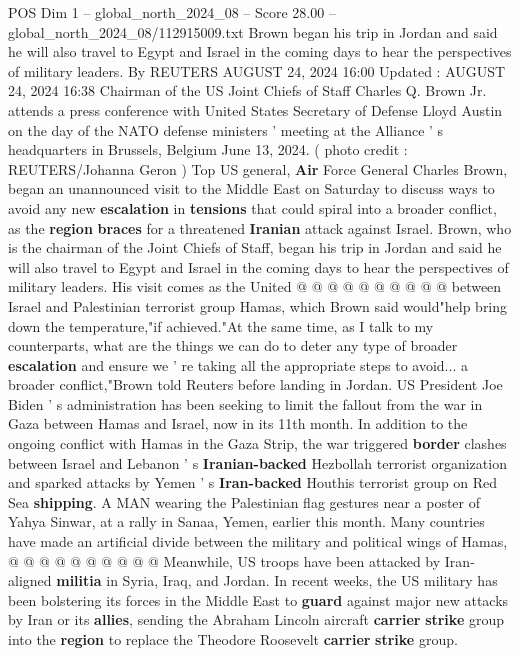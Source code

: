 \begin{textsample}{POS Dim 1 – global\_north\_2024\_08 – Score 28.00 – global\_north\_2024\_08/112915009.txt}  \label{ex:f1_pos_079}
Brown began his trip in Jordan and said he will also travel to Egypt and Israel in the coming days to hear the perspectives of military leaders.
By REUTERS AUGUST 24, 2024 16:00 Updated : AUGUST 24, 2024 16:38 Chairman of the US Joint Chiefs of Staff Charles Q.
Brown Jr. attends a press conference with United States Secretary of Defense Lloyd Austin on the day of the NATO defense ministers ' meeting at the Alliance ' s headquarters in Brussels, Belgium June 13, 2024. ( photo credit : REUTERS/Johanna Geron ) Top US general, \textbf{Air} Force General Charles Brown, began an unannounced visit to the Middle East on Saturday to discuss ways to avoid any new \textbf{escalation} in \textbf{tensions} that could spiral into a broader conflict, as the \textbf{region} \textbf{braces} for a threatened \textbf{Iranian} attack against Israel.
Brown, who is the chairman of the Joint Chiefs of Staff, began his trip in Jordan and said he will also travel to Egypt and Israel in the coming days to hear the perspectives of military leaders.
His visit comes as the United @ @ @ @ @ @ @ @ @ @ between Israel and Palestinian terrorist group Hamas, which Brown said would"help bring down the temperature,"if achieved."At the same time, as I talk to my counterparts, what are the things we can do to deter any type of broader \textbf{escalation} and ensure we ' re taking all the appropriate steps to avoid... a broader conflict,"Brown told Reuters before landing in Jordan.
US President Joe Biden ' s administration has been seeking to limit the fallout from the war in Gaza between Hamas and Israel, now in its 11th month.
In addition to the ongoing conflict with Hamas in the Gaza Strip, the war triggered \textbf{border} clashes between Israel and Lebanon ' s \textbf{Iranian-backed} Hezbollah terrorist organization and sparked attacks by Yemen ' s \textbf{Iran-backed} Houthis terrorist group on Red Sea \textbf{shipping}.
A MAN wearing the Palestinian flag gestures near a poster of Yahya Sinwar, at a rally in Sanaa, Yemen, earlier this month.
Many countries have made an artificial divide between the military and political wings of Hamas, @ @ @ @ @ @ @ @ @ @ Meanwhile, US troops have been attacked by Iran-aligned \textbf{militia} in Syria, Iraq, and Jordan.
In recent weeks, the US military has been bolstering its forces in the Middle East to \textbf{guard} against major new attacks by Iran or its \textbf{allies}, sending the Abraham Lincoln aircraft \textbf{carrier} \textbf{strike} group into the \textbf{region} to replace the Theodore Roosevelt \textbf{carrier} \textbf{strike} group.

\end{textsample}
